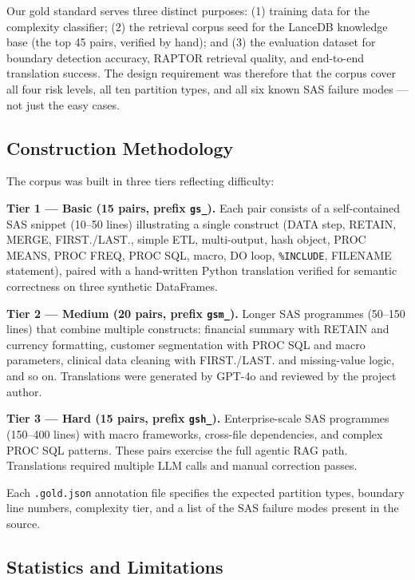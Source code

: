 Our gold standard serves three distinct purposes: (1) training data for the
complexity classifier; (2) the retrieval corpus seed for the LanceDB knowledge
base (the top 45 pairs, verified by hand); and (3) the evaluation dataset for
boundary detection accuracy, RAPTOR retrieval quality, and end-to-end
translation success. The design requirement was therefore that the corpus cover
all four risk levels, all ten partition types, and all six known SAS failure
modes --- not just the easy cases.

\subsection{Construction Methodology}
\label{subsec:corpus-methodology}

The corpus was built in three tiers reflecting difficulty:

\textbf{Tier 1 --- Basic (15 pairs, prefix \texttt{gs\_}).} Each pair consists
of a self-contained SAS snippet (10--50 lines) illustrating a single construct
(DATA step, RETAIN, MERGE, FIRST./LAST., simple ETL, multi-output, hash object,
PROC MEANS, PROC FREQ, PROC SQL, macro, DO loop, \texttt{\%INCLUDE},
FILENAME statement), paired with a hand-written Python translation verified for
semantic correctness on three synthetic DataFrames.

\textbf{Tier 2 --- Medium (20 pairs, prefix \texttt{gsm\_}).} Longer SAS
programmes (50--150 lines) that combine multiple constructs: financial summary
with RETAIN and currency formatting, customer segmentation with PROC SQL and
macro parameters, clinical data cleaning with FIRST./LAST. and missing-value
logic, and so on. Translations were generated by GPT-4o and reviewed by the
project author.

\textbf{Tier 3 --- Hard (15 pairs, prefix \texttt{gsh\_}).} Enterprise-scale
SAS programmes (150--400 lines) with macro frameworks, cross-file dependencies,
and complex PROC SQL patterns. These pairs exercise the full agentic RAG path.
Translations required multiple LLM calls and manual correction passes.

Each \texttt{.gold.json} annotation file specifies the expected partition types,
boundary line numbers, complexity tier, and a list of the SAS failure modes
present in the source.

\subsection{Statistics and Limitations}
\label{subsec:corpus-statistics}

